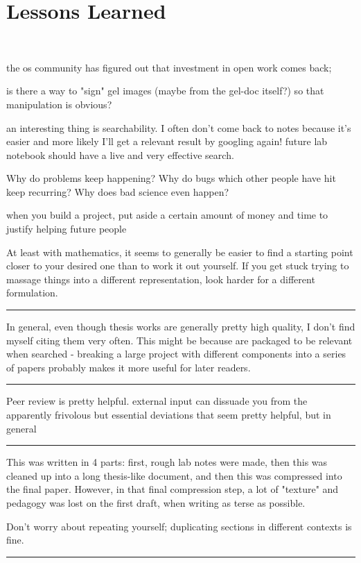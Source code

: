 \documentclass[paper.tex]{subfiles}
\begin{document}
\section{Lessons Learned} \

the os community has figured out that investment in open work comes back; 

is there a way to "sign" gel images (maybe from the gel-doc itself?) so that manipulation is obvious?


an interesting thing is searchability. I often don't come back to notes because it's easier and more likely I'll get a relevant result by googling again! future lab notebook should have a live and very effective search.

Why do problems keep happening? Why do bugs which other people have hit keep recurring? Why does bad science even happen?


when you build a project, put aside a certain amount of money and time to justify helping future people 


At least with mathematics, it seems to generally be easier to find a starting point closer to your desired one than to work it out yourself. If you get stuck trying to massage things into a different representation, look harder for a different formulation.

\rule{\linewidth}{0.2pt}

In general, even though thesis works are generally pretty high quality, I don't find myself citing them very often. This might be because are packaged to be relevant when searched - breaking a large project with different components into a series of papers probably makes it more useful for later readers.

\rule{\linewidth}{0.2pt}

Peer review is pretty helpful. external input can dissuade you from the apparently frivolous but essential deviations that seem pretty helpful, but in general 

\rule{\linewidth}{0.2pt}

This was written in 4 parts: first, rough lab notes were made, then this was cleaned up into a long thesis-like document, and then this was compressed into the final paper. However, in that final compression step, a lot of "texture" and pedagogy was lost on the first draft, when writing as terse as possible. 

Don't worry about repeating yourself; duplicating sections in different contexts is fine.

\rule{\linewidth}{0.2pt}
\end{document}
